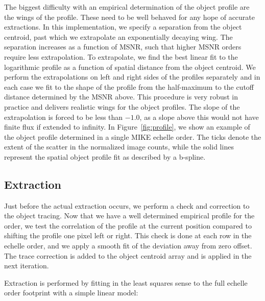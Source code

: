\documentclass[12pt,preprint]{aastex}
\begin{document}
The biggest difficulty with an empirical determination of the object profile 
are the wings of the profile.  These need to be well behaved for any hope of
accurate extractions.  In this implementation, we specify a separation from the
object centroid, past which we extrapolate an exponentially decaying wing.
The separation increases as a function of MSNR, such that higher MSNR orders
require less extrapolation.  To extrapolate, we find the best linear fit
to the logarithmic profile as a function of spatial distance 
from the object centroid.
We perform the extrapolations on left and right sides of the profiles 
separately and in each case we fit to the shape of the profile from the 
half-maximum to the cutoff distance determined by the MSNR above.
This procedure is very robust in practice and delivers realistic wings for
the object profiles.  The slope of the extrapolation is forced to be less
than $-1.0$, as a slope above this would not have finite flux if 
extended to infinity.  In Figure~\ref{fig:profile}, we show an example of the
object profile determined in a single MIKE echelle order.  The ticks denote the
extent of the scatter in the normalized image counts, while the solid lines
represent the spatial object profile fit as described by a b-spline.

\subsection{Extraction}

Just before the actual extraction occurs, we perform
a check and correction to the object tracing.
Now that we have a well determined empirical profile for the order, we test
the correlation of the profile at the current position compared to shifting
the profile one pixel left or right.  This check is done at each row in the
echelle order, and we apply a smooth fit of the
deviation away from zero offset.
The trace correction is added to the object centroid array and
is applied in the next iteration.

Extraction is performed by fitting in the least squares sense 
to the full echelle order footprint with a simple linear model:
\end{document}
